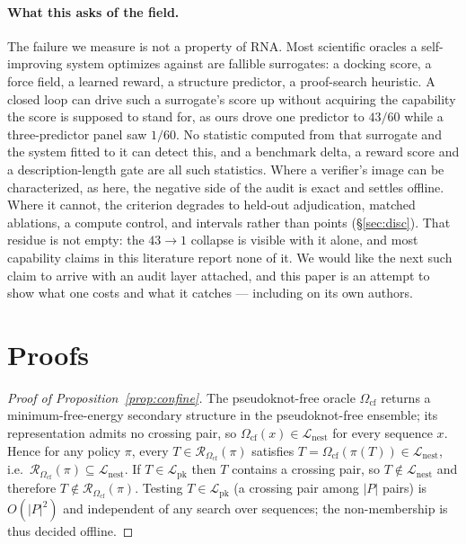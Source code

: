 \documentclass[11pt]{article}
\newcommand{\NESTED}{\ensuremath{\mathcal{L}_{\mathrm{nest}}}}
\newcommand{\PK}{\ensuremath{\mathcal{L}_{\mathrm{pk}}}}
\newcommand{\Ocf}{\ensuremath{\Omega_{\mathrm{cf}}}}
\newcommand{\Rze}[2]{\ensuremath{\mathcal{R}_{#1}(#2)}}
\begin{document}
\paragraph{What this asks of the field.} The failure we measure is not a property of RNA. Most scientific
oracles a self-improving system optimizes against are fallible surrogates: a docking score, a force field, a
learned reward, a structure predictor, a proof-search heuristic. A closed loop can drive such a surrogate's
score up without acquiring the capability the score is supposed to stand for, as ours drove one predictor to
$43/60$ while a three-predictor panel saw $1/60$. No statistic computed from that surrogate and the system
fitted to it can detect this, and a benchmark delta, a reward score and a description-length gate are all
such statistics. Where a verifier's image can be characterized, as here, the negative side of the audit is
exact and settles offline. Where it cannot, the criterion degrades to held-out adjudication, matched
ablations, a compute control, and intervals rather than points (\S\ref{sec:disc}). That residue is not
empty: the $43\!\to\!1$ collapse is visible with it alone, and most capability claims in this literature
report none of it. We would like the next such claim to arrive with an audit layer attached, and this paper
is an attempt to show what one costs and what it catches --- including on its own authors.

\appendix
\section{Proofs}\label{app:proofs}
\begin{proof}[Proof of Proposition~\ref{prop:confine}]
The pseudoknot-free oracle \Ocf{} returns a minimum-free-energy secondary structure in the pseudoknot-free
ensemble; its representation admits no crossing pair, so $\Ocf(x)\in\NESTED$ for every sequence $x$. Hence
for any policy $\pi$, every $T\in\Rze{\Ocf}{\pi}$ satisfies $T=\Ocf(\pi(T))\in\NESTED$, i.e.\
$\Rze{\Ocf}{\pi}\subseteq\NESTED$. If $T\in\PK$ then $T$ contains a crossing pair, so $T\notin\NESTED$ and
therefore $T\notin\Rze{\Ocf}{\pi}$. Testing $T\in\PK$ (a crossing pair among $|P|$ pairs) is $O(|P|^2)$ and
independent of any search over sequences; the non-membership is thus decided offline.
\end{proof}
\end{document}
